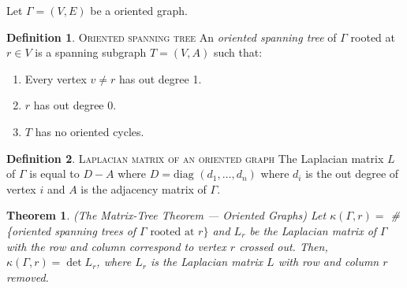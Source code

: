 \documentclass[11pt]{article}
\newtheorem{theorem}{Theorem}[section]
\theoremstyle{definition}
\newtheorem{definition}{Definition}[section]
\begin{document}
	Let $\Gamma = (V,E)$ be a oriented graph.
	
	\theoremstyle{definition}
	\begin{definition}{\textsc{Oriented spanning tree}}
			An \emph{oriented spanning tree} of $\Gamma$ rooted at $r \in V$ is a spanning subgraph $T = (V,A)$ such that:
			\begin{enumerate}
				\item Every vertex $v \neq r$ has out degree 1.
				\item $r$ has out degree 0.
				\item $T$ has no oriented cycles.
			\end{enumerate}
	\end{definition}
	
	\theoremstyle{definition}
	\begin{definition}{\textsc{Laplacian matrix of an oriented graph}}
			The Laplacian matrix $L$ of $\Gamma$ is equal to $D-A$ where $D = \text{diag } (d_1, \dots, d_n)$ where $d_i$ is the out degree of vertex $i$ and $A$ is the adjacency matrix of $\Gamma$.
	\end{definition}
	
	\begin{theorem}{(The Matrix-Tree Theorem --- Oriented Graphs)}
			Let $\kappa(\Gamma, r) =$ \# \{oriented spanning trees of $\Gamma \text{ rooted at } r\}$ and $L_r$ be the Laplacian matrix of $\Gamma$ with the row and column correspond to vertex $r$ crossed out. 
			Then, $\kappa(\Gamma, r) = \det L_r$, where $L_r$ is the Laplacian matrix $L$ with row and column $r$ removed.
	\end{theorem}
	
\end{document}
